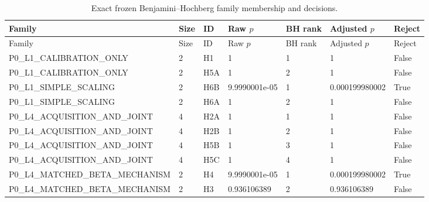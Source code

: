 \documentclass[10pt]{article}
\begin{document}
\begingroup\scriptsize
\begin{longtable}{L{1.8in}L{.4in}L{.4in}L{.75in}L{.6in}L{.85in}L{.6in}}
\caption{Exact frozen Benjamini--Hochberg family membership and decisions.}\\
\toprule
Family & Size & ID & Raw $p$ & BH rank & Adjusted $p$ & Reject\\
\midrule
\endfirsthead
\toprule
Family & Size & ID & Raw $p$ & BH rank & Adjusted $p$ & Reject\\
\midrule
\endhead
P0\_\allowbreak{}L1\_\allowbreak{}CALIBRATION\_\allowbreak{}ONLY & 2 & H1 & 1 & 1 & 1 & False\\
P0\_\allowbreak{}L1\_\allowbreak{}CALIBRATION\_\allowbreak{}ONLY & 2 & H5A & 1 & 2 & 1 & False\\
P0\_\allowbreak{}L1\_\allowbreak{}SIMPLE\_\allowbreak{}SCALING & 2 & H6B & 9.9990001e-05 & 1 & 0.000199980002 & True\\
P0\_\allowbreak{}L1\_\allowbreak{}SIMPLE\_\allowbreak{}SCALING & 2 & H6A & 1 & 2 & 1 & False\\
P0\_\allowbreak{}L4\_\allowbreak{}ACQUISITION\_\allowbreak{}AND\_\allowbreak{}JOINT & 4 & H2A & 1 & 1 & 1 & False\\
P0\_\allowbreak{}L4\_\allowbreak{}ACQUISITION\_\allowbreak{}AND\_\allowbreak{}JOINT & 4 & H2B & 1 & 2 & 1 & False\\
P0\_\allowbreak{}L4\_\allowbreak{}ACQUISITION\_\allowbreak{}AND\_\allowbreak{}JOINT & 4 & H5B & 1 & 3 & 1 & False\\
P0\_\allowbreak{}L4\_\allowbreak{}ACQUISITION\_\allowbreak{}AND\_\allowbreak{}JOINT & 4 & H5C & 1 & 4 & 1 & False\\
P0\_\allowbreak{}L4\_\allowbreak{}MATCHED\_\allowbreak{}BETA\_\allowbreak{}MECHANISM & 2 & H4 & 9.9990001e-05 & 1 & 0.000199980002 & True\\
P0\_\allowbreak{}L4\_\allowbreak{}MATCHED\_\allowbreak{}BETA\_\allowbreak{}MECHANISM & 2 & H3 & 0.936106389 & 2 & 0.936106389 & False\\
\bottomrule
\end{longtable}
\endgroup
\end{document}
